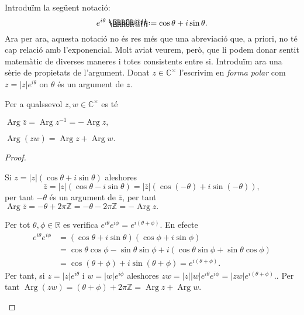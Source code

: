 \documentclass[12pt,twoside]{report}
\makeatletter
\numberwithin{table}{section}
\numberwithin{equation}{section}
\numberwithin{figure}{section}
\newcommand{\Z}{\ensuremath{\mathbb{Z}}}
\newcommand{\R}{\ensuremath{\mathbb{R}}}
\newcommand{\Cu}{\ensuremath{\mathbb{C}^\times}}
\newcommand{\abs}[1]{\left\lvert #1 \right\rvert}
\DeclareMathOperator{\Arg}{Arg}
\newcommand*{\defeq}{\mathrel{\rlap{%
    \raisebox{0.3ex}{$\m@th\cdot$}}%
  \raisebox{-0.3ex}{$\m@th\cdot$}}%
	=
}
\makeatother
\begin{document}
Introduïm la següent notació:
\begin{equation*}
	e^{i\theta} \defeq \cos{\theta} + i\sin{\theta}.
\end{equation*}
Ara per ara, aquesta notació no és res més que una abreviació que, a priori, no té cap relació amb l'exponencial. Molt aviat veurem, però, que li podem donar sentit matemàtic de diverses maneres i totes consistents entre si. Introduïm ara una sèrie de propietats de l'argument. Donat \( z \in \Cu \) l'escrivim en \emph{forma polar} com \( z = \abs{z}e^{i\theta} \) on \( \theta \) és un argument de \( z \).

\begin{prop}[name=Propietats de l'argument]\label{prop:propietats de l'argument}
Per a qualssevol \( z, w \in \Cu \) es té
	\begin{punts}
	\item \( \Arg \bar{z} = \Arg z^{-1} = - \Arg{z}, \) 
	\item \( \Arg{(zw)} = \Arg z + \Arg w. \)
	\end{punts}
\end{prop}

\begin{proof}
	\begin{punts}
	\item	Si \( z = \abs{z}(\cos{\theta} + i \sin{\theta}) \) aleshores \[ \bar{z} = \abs{z}(\cos{\theta} - i\sin{\theta}) = \abs{\bar{z}}(\cos{(-\theta)} + i \sin{(-\theta)}), \] per tant \( -\theta \) és un argument de \( \bar{z} \), per tant \( \Arg{\bar{z}} = -\theta + 2\pi\Z = -\theta - 2\pi\Z = - \Arg{z}. \)

	\item Per tot \( \theta, \phi \in \R \) es verifica \( e^{i\theta}e^{i\phi} = e^{i(\theta + \phi)} \). En efecte
		\begin{align*}
			e^{i\theta}e^{i\phi} & = (\cos{\theta} + i \sin{\theta})(\cos{\phi} + i \sin{\phi}) \\
													 & = \cos{\theta}\cos{\phi} - \sin{\theta}\sin{\phi} + i(\cos{\theta}\sin{\phi} + \sin{\theta}\cos{\phi}) \\
													 & = \cos{(\theta + \phi)} + i \sin{(\theta + \phi)} = e^{i(\theta + \phi)}.
		\end{align*}
		Per tant, si \( z = \abs{z}e^{i\theta} \) i \( w = \abs{w}e^{i\phi} \) aleshores \( zw = \abs{z}\abs{w} e^{i\theta} e^{i\phi} = \abs{zw} e^{i(\theta + \phi)}. \). Per tant \( \Arg{(zw)} = (\theta + \phi) + 2\pi\Z = \Arg{z} + \Arg{w} \). \qedhere
	\end{punts}
\end{proof}
\end{document}
